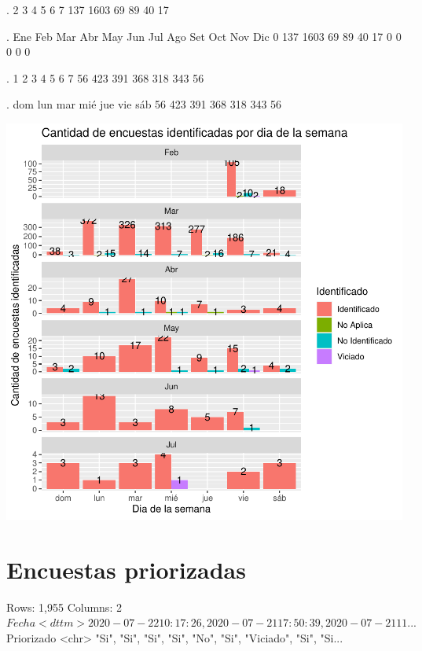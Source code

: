 \documentclass{article}
\begin{document}
\begin{Schunk}
\begin{Soutput}
.
   2    3    4    5    6    7 
 137 1603   69   89   40   17 
\end{Soutput}
\begin{Soutput}
.
 Ene  Feb  Mar  Abr  May  Jun  Jul  Ago  Set  Oct  Nov  Dic 
   0  137 1603   69   89   40   17    0    0    0    0    0 
\end{Soutput}
\begin{Soutput}
.
  1   2   3   4   5   6   7 
 56 423 391 368 318 343  56 
\end{Soutput}
\begin{Soutput}
.
dom lun mar mié jue vie sáb 
 56 423 391 368 318 343  56 
\end{Soutput}
\end{Schunk}
\includegraphics{seguimientov4-008}


\section{Encuestas priorizadas}

\begin{Schunk}
\begin{Soutput}
Rows: 1,955
Columns: 2
$ Fecha      <dttm> 2020-07-22 10:17:26, 2020-07-21 17:50:39, 2020-07-21 11...
$ Priorizado <chr> "Si", "Si", "Si", "Si", "No", "Si", "Viciado", "Si", "Si...
\end{Soutput}
\end{Schunk}
\end{document}
